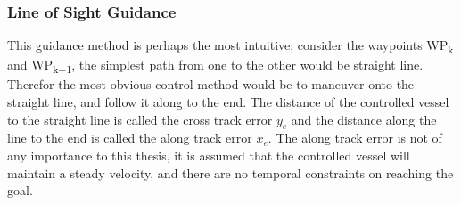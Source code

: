 \subsubsection*{Line of Sight Guidance}

This guidance method is perhaps the most intuitive; consider the waypoints WP\textsubscript{k} and WP\textsubscript{k+1}, the simplest path
from one to the other would be straight line. Therefor the most obvious control method would be to maneuver onto the straight line, and
follow it along to the end. The distance of the controlled vessel to the straight line is called the cross track error $y_e$ and the distance along the line
to the end is called the along track error $x_e$. The along track error is not of any importance to this thesis, it is assumed that the controlled
vessel will maintain a steady velocity, and there are no temporal constraints on reaching the goal.

